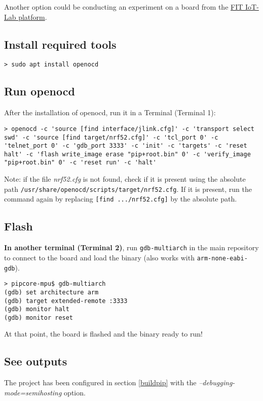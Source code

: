 \documentclass[10pt,a4paper,titlepage]{refart}
\begin{document}
Another option could be conducting an experiment on a board from the \href{https://www.iot-lab.info/}{FIT IoT-Lab platform}.

\subsection{Install required tools}
\begin{lstlisting}[style=BashStyle]
> sudo apt install openocd
\end{lstlisting}

\subsection{Run openocd}
After the installation of openocd, run it in a Terminal (Terminal 1):

\begin{lstlisting}[style=BashStyle]
> openocd -c 'source [find interface/jlink.cfg]' -c 'transport select swd' -c 'source [find target/nrf52.cfg]' -c 'tcl_port 0' -c 'telnet_port 0' -c 'gdb_port 3333' -c 'init' -c 'targets' -c 'reset halt' -c 'flash write_image erase "pip+root.bin" 0' -c 'verify_image "pip+root.bin" 0' -c 'reset run' -c 'halt'
\end{lstlisting}
Note: if the file \textit{nrf52.cfg} is not found, check if it is present using the absolute path 
\texttt{/usr/share/openocd/scripts/target/nrf52.cfg}. If it is present, run the command again by replacing 
\texttt{[find .../nrf52.cfg]} by the absolute path.

\subsection{Flash}
\textbf{In another terminal (Terminal 2)}, run \texttt{gdb-multiarch} in the main repository to connect to the board and load the binary (also works with \texttt{arm-none-eabi-gdb}).

\begin{lstlisting}[style=BashStyle]
> pipcore-mpu$ gdb-multiarch
(gdb) set architecture arm
(gdb) target extended-remote :3333
(gdb) monitor halt
(gdb) monitor reset
\end{lstlisting}

At that point, the board is flashed and the binary ready to run!

\subsection{See outputs}
The project has been configured in section \ref{buildpip} with the \textit{--debugging-mode=semihosting} option.
\end{document}
